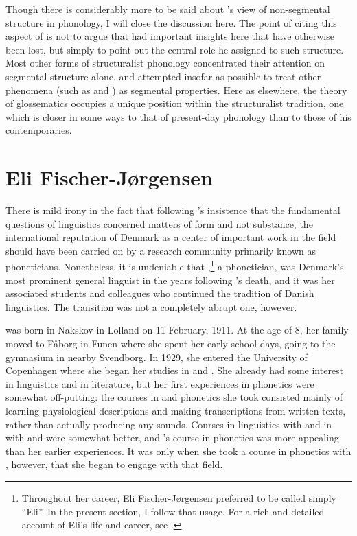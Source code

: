 Though there is considerably more to be said about {\Hjelmslev}'s view of
non-segmental structure in phonology, I will close the discussion here. The
point of citing this aspect of  is not to argue that
{\Hjelmslev} had important insights here that have otherwise been lost,
but simply to point out the central role he assigned to such
structure. Most other forms of structuralist phonology concentrated
their attention on segmental structure alone, and attempted insofar as
possible to treat other phenomena (such as  and ) as
segmental properties. Here as elsewhere, the theory of glossematics
occupies a unique position within the structuralist tradition, one
which is closer in some ways to that of present-day phonology than to
those of his contemporaries.


\section{Eli Fischer-Jørgensen}
\label{sec:eli}

There is mild irony in the fact that following {\Hjelmslev}'s insistence
that the fundamental questions of linguistics concerned matters of
form and not substance, the international reputation of Denmark as a
center of important work in the field should have been carried on by a
research community primarily known as phoneticians. Nonetheless, it is
undeniable that {\Eli},\footnote{Throughout her career, Eli
  Fischer-Jørgensen preferred to be called simply ``Eli''. In the
  present section, I follow that usage. For a rich and detailed
  account of Eli's life and career, see \citealt{skytte16:eli}.} a
phonetician, was Denmark's most prominent general linguist in the
years following {\Hjelmslev}'s death, and it was her associated students
and colleagues who continued the tradition of {Danish} linguistics. The
transition was not a completely abrupt one, however.

{\Eli} was born in Nakskov in Lolland on 11 February, 1911. At the age of
8, her family moved to Fåborg in Funen where she spent her early
school days, going to the gymnasium in nearby Svendborg. In 1929, she
entered the University of Copenhagen where she began her studies in
 and .  She already had some interest in linguistics and
in literature, but her first experiences in phonetics were somewhat
off-putting: the courses in  and  phonetics she took
consisted mainly of learning physiological descriptions and making
transcriptions from written texts, rather than actually producing any
sounds. Courses in  linguistics with  and in
 with  and  were somewhat better,
and {}'s course in  phonetics was more appealing than her
earlier experiences. It was only when she took a course in 
phonetics with , however, that she began to engage with
that field.


